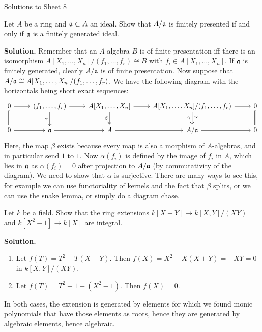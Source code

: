 \documentclass[a4paper,11pt]{article}
\begin{document}
\begin{center}
    \huge{Solutions to Sheet 8}
\end{center}

Let $A$ be a ring and $\mathfrak{a} \subset A$ an ideal. Show that $A/\mathfrak{a}$ is finitely 
presented if and only if $\mathfrak{a}$ is a finitely generated ideal.

\textbf{Solution.} 
Remember that an $A$-algebra $B$ is of finite presentation iff there is an isomorphism
$A[X_1, \dots, X_n]/(f_1, \dots, f_r) \cong B$ with $f_i \in A[X_1, \dots,
X_n]$. If $\mathfrak{a}$ is finitely generated, clearly $A/\mathfrak{a}$ is of finite
presentation. Now suppose that $A/\mathfrak{a} \cong A[X_1, \dots, X_n]/(f_1, \dots, f_r)$. 
We have the following diagram with the horizontals being short exact sequences:
\[
\begin{tikzcd}[ampersand replacement=\&]
	0 \& {(f_1, \dots, f_r)} \& {A[X_1, \dots, X_n]} \& {A[X_1, \dots, X_n]/(f_1, \dots, f_r)} \& 0 \\
	0 \& \fa \& A \& {A/\fa} \& 0
	\arrow[from=1-2, to=1-3]
	\arrow[from=1-3, to=1-4]
	\arrow[from=1-1, to=1-2]
	\arrow[from=1-4, to=1-5]
	\arrow[from=2-1, to=2-2]
	\arrow[from=2-2, to=2-3]
	\arrow[from=2-3, to=2-4]
	\arrow["\cong", from=1-4, to=2-4]
	\arrow["\beta"', two heads, from=1-3, to=2-3]
	\arrow["\alpha"', from=1-2, to=2-2]
	\arrow[from=2-4, to=2-5]
	\arrow[Rightarrow, no head, from=1-5, to=2-5]
	\arrow[Rightarrow, no head, from=1-1, to=2-1]
	\arrow["\gamma"', from=1-4, to=2-4]
\end{tikzcd}
\]
Here, the map $\beta$ exists because every map is also a morphism of $A$-algebras,
and in particular send $1$ to $1$. Now $\alpha(f_i)$ is defined by the image
of $f_i$ in $A$, which lies in $\mathfrak{a}$ as $\alpha(f_i) = 0$ after projection
to $A/\mathfrak{a}$ (by commutativity of the diagram).
We need to show that $\alpha$ is surjective. There are many ways to see this, for example
we can use functoriality of kernels and the fact that $\beta$ splits, or we can use
the snake lemma, or simply do a diagram chase. 

Let $k$ be a field. Show that the ring extensions $k[X+Y] \to k[X,Y]/(XY)$ and
$k[X^2-1] \to k[X]$ are integral.

\textbf{Solution.} 
\begin{enumerate}
    \item Let $f(T) = T^2-T(X+Y)$. Then $f(X) = X^2 - X(X+Y) = -XY = 0$ in $k[X,Y]/(XY)$.
    \item Let $f(T) = T^2-1 - (X^2-1)$. Then $f(X) = 0$.
\end{enumerate}
In both cases, the extension is generated by elements for which we found monic polynomials
that have those elements as roots, hence they are generated by algebraic elements, 
hence algebraic.
\end{document}
